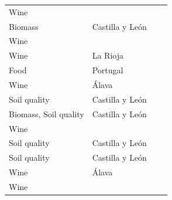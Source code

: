 {\begin{longtable}{llll}
Wine &  & \citet{Jordaoetal2006VolatileComposition}\\
Biomass & Castilla y León & \citet{Canellasetal2004GrowthResponse}\\
Wine &  & \citet{DeConincketal2006EvolutionPhenolic}\\
Wine & La Rioja & \citet{FernandezdeSimonetal2003VolatileCompounds}\\
Food & Portugal & \citet{FerreiraDiasetal2003PatternRecognition}\\
Wine & Álava & \citet{Cadahiaetal2003VolatileCompounds}\\
Soil quality & Castilla y León & \citet{Schneideretal2001PhosphataseActivity}\\
Biomass, Soil quality & Castilla y León & \citet{Rappetal1999BiomassNutrient}\\
Wine &  & \citet{FernandezdeSimonetal1999EvolutionPhenolic}\\
Soil quality & Castilla y León & \citet{Gallardoetal1999NutrientEfficiency}\\
Soil quality & Castilla y León & \citet{Martinetal1997LongtermDecomposition}\\
Wine & Álava & \citet{Cadahiaetal2001EvolutionEllagitannins}\\
Wine &  & \citet{FernandezdeSimonetal1996LowMolecular}\\
\bottomrule
\end{longtable}
}%